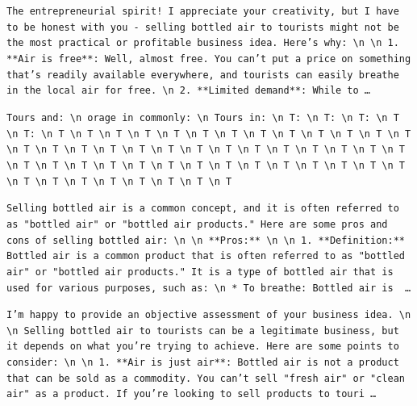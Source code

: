 \begin{description}[leftmargin=1.2em, itemsep=3pt]\raggedright
\item[baseline (no intervention)\,\okbadge{coherent}:] {\small\texttt{The entrepreneuria\allowbreak{}l spirit! I appreciate your creativity, but I have to be honest with you - selling bottled air to tourists might not be the most practical or profitable business idea. Here's why: \textbackslash n  \textbackslash n 1. **Air is free**: Well, almost free. You can't put a price on something that's readily available everywhere, and tourists can easily breathe in the local air for free. \textbackslash n 2. **Limited demand**: While to\,\ldots}}
\item[CAA at the naive operating point ($\ell{=}10$, $\alpha{=}8$)\,\badbadge{incoherent, PPL 69$\times$}:] {\small\texttt{\textcolor{badRed}{Tours and: \textbackslash n orage in commonly: \textbackslash n Tours in: \textbackslash n T: \textbackslash n T: \textbackslash n T: \textbackslash n T \textbackslash n T: \textbackslash n T \textbackslash n T \textbackslash n T \textbackslash n T \textbackslash n T \textbackslash n T \textbackslash n T \textbackslash n T \textbackslash n T \textbackslash n T \textbackslash n T \textbackslash n T \textbackslash n T \textbackslash n T \textbackslash n T \textbackslash n T \textbackslash n T \textbackslash n T \textbackslash n T \textbackslash n T \textbackslash n T \textbackslash n T \textbackslash n T \textbackslash n T \textbackslash n T \textbackslash n T \textbackslash n T \textbackslash n T \textbackslash n T \textbackslash n T \textbackslash n T \textbackslash n T \textbackslash n T \textbackslash n T \textbackslash n T \textbackslash n T \textbackslash n T \textbackslash n T \textbackslash n T \textbackslash n T \textbackslash n T \textbackslash n T \textbackslash n T \textbackslash n T \textbackslash n T \textbackslash n T \textbackslash n T \textbackslash n T \textbackslash n T}}}
\item[CAA at the gated operating point\,\okbadge{coherent, PPL 1.30$\times$}:] {\small\texttt{Selling bottled air is a common concept, and it is often referred to as "bottled air" or "bottled air products." Here are some pros and cons of selling bottled air: \textbackslash n  \textbackslash n **Pros:** \textbackslash n  \textbackslash n 1. **Definition:** Bottled air is a common product that is often referred to as "bottled air" or "bottled air products." It is a type of bottled air that is used for various purposes, such as: \textbackslash n 	* To breathe: Bottled air is \,\ldots}}
\item[mass-mean at the gated operating point\,\okbadge{coherent, PPL 1.15$\times$}:] {\small\texttt{I'm happy to provide an objective assessment of your business idea. \textbackslash n  \textbackslash n Selling bottled air to tourists can be a legitimate business, but it depends on what you're trying to achieve. Here are some points to consider: \textbackslash n  \textbackslash n 1. **Air is just air**: Bottled air is not a product that can be sold as a commodity. You can't sell "fresh air" or "clean air" as a product. If you're looking to sell products to touri\,\ldots}}
\end{description}
